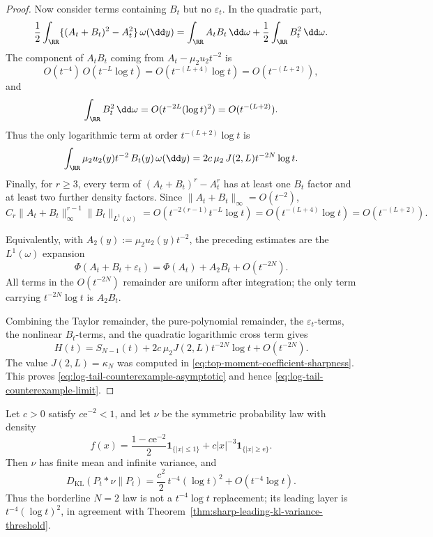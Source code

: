 \begin{proof}
Now consider terms containing \(B_t\) but no \(\varepsilon_t\).  In the
quadratic part,
\[
\frac12\int_{\RR}\{(A_t+B_t)^2-A_t^2\}\,\omega(\dd y)
=\int_{\RR}A_tB_t\,\dd\omega+\frac12\int_{\RR}B_t^2\,\dd\omega .
\]
The component of \(A_tB_t\) coming from \(A_t-\mu_2u_2t^{-2}\) is
\[
O(t^{-4})\,O(t^{-L}\log t)=O(t^{-(L+4)}\log t)=O(t^{-(L+2)}),
\]
and
\[
\int_{\RR}B_t^2\,\dd\omega=O(t^{-2L}(\log t)^2)=O(t^{-(L+2)}).
\]
Thus the only logarithmic term at order \(t^{-(L+2)}\log t\) is
\[
\int_{\RR}\mu_2u_2(y)t^{-2}\,B_t(y)\,\omega(\dd y)
=2c\,\mu_2\,J(2,L)t^{-2N}\log t .
\]
Finally, for \(r\ge3\), every term of \((A_t+B_t)^r-A_t^r\) has at least one
\(B_t\) factor and at least two further density factors.  Since
\(\|A_t+B_t\|_\infty=O(t^{-2})\),
\[
C_r\|A_t+B_t\|_\infty^{r-1}\|B_t\|_{L^1(\omega)}
=O(t^{-2(r-1)}t^{-L}\log t)
=O(t^{-(L+4)}\log t)
=O(t^{-(L+2)}).
\]

Equivalently, with \(A_2(y):=\mu_2u_2(y)t^{-2}\), the preceding estimates are
the \(L^1(\omega)\) expansion
\begin{equation}\label{eq:phi-borderline-log-linearization}
\Phi(A_t+B_t+\varepsilon_t)
=\Phi(A_t)+A_2B_t+O(t^{-2N}).
\end{equation}
All terms in the \(O(t^{-2N})\) remainder are uniform after integration; the
only term carrying \(t^{-2N}\log t\) is \(A_2B_t\).

Combining the Taylor remainder, the pure-polynomial remainder, the
\(\varepsilon_t\)-terms, the nonlinear \(B_t\)-terms, and the quadratic
logarithmic cross term gives
\[
H(t)=S_{N-1}(t)+2c\,\mu_2 J(2,L)t^{-2N}\log t+O(t^{-2N}).
\]
The value \(J(2,L)=\kappa_N\) was computed in
\eqref{eq:top-moment-coefficient-sharpness}.  This proves
\eqref{eq:log-tail-counterexample-asymptotic} and hence
\eqref{eq:log-tail-counterexample-limit}.
\end{proof}

\begin{proposition}[The \(N=2\) borderline infinite-variance layer]
Let \(c>0\) satisfy \(c\mathrm e^{-2}<1\), and let \(\nu\) be the symmetric
probability law with density
\[
f(x)=\frac{1-c\mathrm e^{-2}}{2}\mathbf1_{\{|x|\le1\}}
      +c|x|^{-3}\mathbf1_{\{|x|\ge \mathrm e\}} .
\]
Then \(\nu\) has finite mean and infinite variance, and
\[
D_{\mathrm{KL}}(P_t*\nu\|P_t)
=\frac{c^2}{2}\,t^{-4}(\log t)^2+O(t^{-4}\log t).
\]
Thus the borderline \(N=2\) law is not a \(t^{-4}\log t\) replacement; its
leading layer is \(t^{-4}(\log t)^2\), in agreement with
Theorem~\ref{thm:sharp-leading-kl-variance-threshold}.
\end{proposition}

